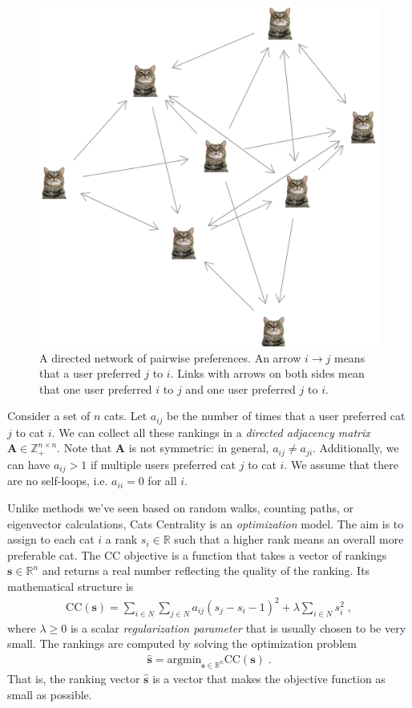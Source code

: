 \documentclass{hw}
\begin{document}
\begin{figure}[h] 
    \centering
    \includegraphics[width=.7\textwidth]{img/cat-rank.png}
    \caption{A directed network of pairwise preferences. 
    An arrow $i \rightarrow j$ means that a user preferred $j$ to $i$. 
    Links with arrows on both sides mean that one user preferred $i$ to $j$ and one user preferred $j$ to $i$.}   \label{fig:cat-rank}
\end{figure}


Consider a set of $n$ cats. 
Let $a_{ij}$ be the number of times that a user preferred cat $j$ to cat $i$. 
We can collect all these rankings in a \emph{directed adjacency matrix} $\mathbf{A} \in \mathbb{Z}_{+}^{n\times n}$. 
Note that $\mathbf{A}$ is not symmetric: in general, $a_{ij} \neq a_{ji}$.  
Additionally, we can have $a_{ij} > 1$ if multiple users preferred cat $j$ to cat $i$. 
We assume that there are no self-loops, i.e. $a_{ii} = 0$ for all $i$. 

Unlike methods we've seen based on random walks, counting paths, or eigenvector calculations, Cats Centrality is an \emph{optimization} model. 
The aim is to assign to each cat $i$ a rank $s_i \in \mathbb{R}$ such that a higher rank means an overall more preferable cat. 
The CC objective is a function that takes a vector of rankings $\mathbf{s}\in \mathbb{R}^n$ and returns a real number reflecting the quality of the ranking. 
Its mathematical structure is 
\begin{align}
    \mathrm{CC}(\mathbf{s}) = \sum_{i \in N}\sum_{j \in N}a_{ij}(s_j - s_i - 1)^2 + \lambda \sum_{i\in N}s_i^2\;, \label{eq:RCR}
\end{align} 
where $\lambda \geq 0$ is a scalar \emph{regularization parameter} that is usually chosen to be very small. 
The rankings are computed by solving the optimization problem 
\begin{align}
    \hat{\mathbf{s}} = \mathrm{argmin}_{\mathbf{s}\in \mathbb{R}^n} \mathrm{CC}(\mathbf{s})\;. 
\end{align}
That is, the ranking vector $\hat{\mathbf{s}}$ is a vector that makes the objective function as small as possible. 
\end{document}

